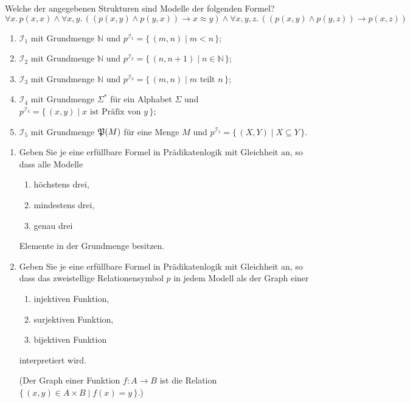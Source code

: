 \documentclass[german]{latteachCD}[2017/03/28]
\begin{document}
\setcounter{exercise}{0}

\enlargethispage{2\baselineskip}

\begin{exercise}
  Welche der angegebenen Strukturen sind Modelle der folgenden Formel?
  \begin{equation*}
    \forall x.\, p(x,x) \land \forall x, y.\, ((p(x,y) \land
      p(y,x)) \to x \approx y)
    \land \forall x, y, z.\, ((p(x,y) \land p(y,z)) \to p(x,z))
  \end{equation*}
  \begin{enumerate}
  \item $\mathcal{I}_{1}$ mit Grundmenge $\mathbb N$ und $p^{\mathcal{I}_{1}} =
    \{\,(m,n) \mid m < n \,\}$;
  \item $\mathcal{I}_{2}$ mit Grundmenge $\mathbb N$ und $p^{\mathcal{I}_{2}} =
    \{\,(n,n+1) \mid n \in \mathbb N \,\}$;
  \item $\mathcal{I}_{3}$ mit Grundmenge $\mathbb N$ und $p^{\mathcal{I}_{3}} =
    \{\,(m,n) \mid m \text{ teilt } n\,\}$;
  \item $\mathcal{I}_{4}$ mit Grundmenge $\Sigma^{*}$ für ein Alphabet $\Sigma$
    und $p^{\mathcal{I}_{4}} = \{\,(x,y) \mid x \text{ ist Präfix von } y\,\}$;
  \item $\mathcal{I}_{5}$ mit Grundmenge $\mathfrak{P}(M)$ für eine Menge $M$ und
    $p^{\mathcal{I}_{5}} = \{\,(X,Y) \mid X \subseteq Y\,\}$.
  \end{enumerate}
\end{exercise}

\begin{exercise}
  \begin{enumerate}
  \item Geben Sie je eine erfüllbare Formel in Prädikatenlogik mit Gleichheit
    an, so dass alle Modelle
    \begin{enumerate}
    \item höchstens drei,
    \item mindestens drei,
    \item genau drei
    \end{enumerate}
    Elemente in der Grundmenge besitzen.
  \item Geben Sie je eine erfüllbare Formel in Prädikatenlogik mit Gleichheit
    an, so dass das zweistellige Relationensymbol $p$ in jedem Modell als der
    Graph einer
    \begin{enumerate}
    \item injektiven Funktion,
    \item surjektiven Funktion,
    \item bijektiven Funktion
    \end{enumerate}
    interpretiert wird.

    (Der Graph einer Funktion $f \colon A \to B$ ist die Relation $\{\,(x,y) \in
    A \times B \mid f(x) = y\,\}$.)
  \end{enumerate}
\end{exercise}
\end{document}
